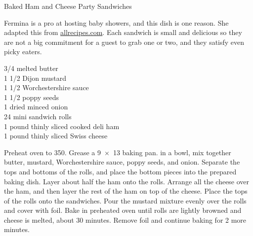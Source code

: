 \begin{entry}{Baked Ham and Cheese Party Sandwiches}

\begin{open}
  Fermina is a pro at hosting baby showers, and this dish is one reason. She
  adapted this from \url{allrecipes.com}. Each sandwich is small and delicious
  so they are not a big commitment for a guest to grab one or two, and they
  satisfy even picky eaters.
\end{open}
\begin{ingredients}
    \SI{3/4}{\cup} melted butter\\
    1 \SI{1/2}{\tblspoon} Dijon mustard\\
    1 \SI{1/2}{\teaspoon} Worchestershire sauce\\
    1 \SI{1/2}{\tblspoon} poppy seeds\\
    \SI{1}{\tblspoon} dried minced onion\\
    24 mini sandwich rolls\\
    1 pound thinly sliced cooked deli ham\\
    1 pound thinly sliced Swiss cheese
\end{ingredients}
Preheat oven to \SI{350}{\degreeF}. Grease a \SI{9x13}{\inch} baking pan. in a
bowl, mix together butter, mustard, Worchestershire sauce, poppy seeds, and
onion. Separate the tops and bottoms of the rolls, and place the bottom pieces
into the prepared baking dish. Layer about half the ham onto the
rolls. Arrange all the cheese over the ham, and then layer the rest of the ham
on top of the cheese. Place the tops of the rolls onto the sandwiches. Pour
the mustard mixture evenly over the rolls and cover with foil. Bake in
preheated oven until rolls are lightly browned and cheese is melted, about 30
minutes. Remove foil and continue baking for 2 more minutes.
\end{entry}

